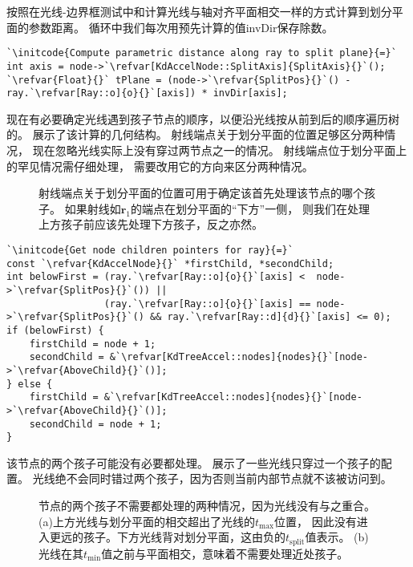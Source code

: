 按照在光线-边界框测试中和计算光线与轴对齐平面相交一样的方式计算到划分平面的参数距离。
循环中我们每次用预先计算的值{\ttfamily invDir}保存除数。
\begin{lstlisting}
`\initcode{Compute parametric distance along ray to split plane}{=}`
int axis = node->`\refvar[KdAccelNode::SplitAxis]{SplitAxis}{}`();
`\refvar{Float}{}` tPlane = (node->`\refvar{SplitPos}{}`() - ray.`\refvar[Ray::o]{o}{}`[axis]) * invDir[axis];
\end{lstlisting}

现在有必要确定光线遇到孩子节点的顺序，以便沿光线按从前到后的顺序遍历树的。
展示了该计算的几何结构。
射线端点关于划分平面的位置足够区分两种情况，
现在忽略光线实际上没有穿过两节点之一的情况。
射线端点位于划分平面上的罕见情况需仔细处理，
需要改用它的方向来区分两种情况。
\begin{figure}[htbp]
    \centering
    \caption{射线端点关于划分平面的位置可用于确定该首先处理该节点的哪个孩子。
    如果射线如$\bm r_1$的端点在划分平面的“下方”一侧，
    则我们在处理上方孩子前应该先处理下方孩子，反之亦然。}
    \label{fig:4.18}
\end{figure}
\begin{lstlisting}
`\initcode{Get node children pointers for ray}{=}`
const `\refvar{KdAccelNode}{}` *firstChild, *secondChild;
int belowFirst = (ray.`\refvar[Ray::o]{o}{}`[axis] <  node->`\refvar{SplitPos}{}`()) ||
                 (ray.`\refvar[Ray::o]{o}{}`[axis] == node->`\refvar{SplitPos}{}`() && ray.`\refvar[Ray::d]{d}{}`[axis] <= 0);
if (belowFirst) {
    firstChild = node + 1;
    secondChild = &`\refvar[KdTreeAccel::nodes]{nodes}{}`[node->`\refvar{AboveChild}{}`()];
} else {
    firstChild = &`\refvar[KdTreeAccel::nodes]{nodes}{}`[node->`\refvar{AboveChild}{}`()];
    secondChild = node + 1;
}
\end{lstlisting}

该节点的两个孩子可能没有必要都处理。
展示了一些光线只穿过一个孩子的配置。
光线绝不会同时错过两个孩子，因为否则当前内部节点就不该被访问到。
\begin{figure}[htbp]
    \centering
    \caption{节点的两个孩子不需要都处理的两种情况，因为光线没有与之重合。
    (a)上方光线与划分平面的相交超出了光线的$t_{\max}$位置，
    因此没有进入更远的孩子。下方光线背对划分平面，这由负的$t_{\text{split}}$值表示。
    (b)光线在其$t_{\min}$值之前与平面相交，意味着不需要处理近处孩子。}
    \label{fig:4.19}
\end{figure}


